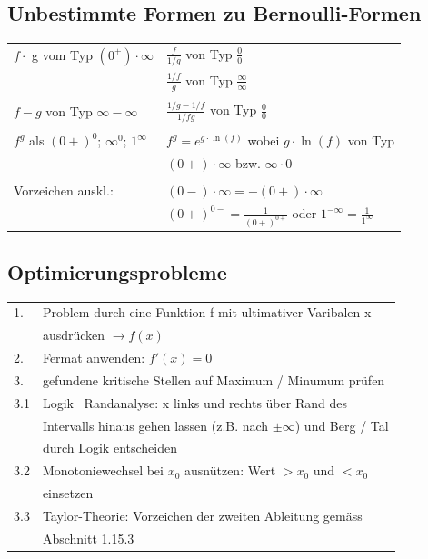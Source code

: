 		\subsection{Unbestimmte Formen zu Bernoulli-Formen}		
		\begin{tabular}{ll}
		$f \cdot$ g vom Typ $(0^+) \cdot \infty$ & $\frac{f}{1 / g}$ von Typ $\frac{0}{0}$ \\
		&   $\frac{1 / f}{g}$ von Typ $\frac{\infty}{\infty}$ \\
		\\
		$f - g$ von Typ $\infty - \infty$ & $\frac{1/g - 1/f}{1/ fg}$ von Typ $\frac{0}{0}$   \\
		\\
		$f^g$ als $(0+)^0$; $\infty^0$; $1^{\infty}$ & $f^g = e^{g \cdot \ln(f)}$ wobei $g \cdot \ln(f)$ von Typ \\
		& $(0+) \cdot \infty$ bzw. $ \infty \cdot 0$ \\
		\\
		Vorzeichen auskl.: & $(0-) \cdot \infty = -(0+) \cdot \infty$ \\
		& $(0+)^{0-} = \frac{1}{(0+)^{0+}}$ oder $1^{-\infty} = \frac{1}{1^{\infty}}$\\
		\end{tabular}
		
		
		\subsection{Optimierungsprobleme}
		\begin{tabular}{ll}
		1. & Problem durch eine Funktion f mit ultimativer Varibalen x \\
		& ausdrücken $\rightarrow f(x)$ \\
		2. & Fermat anwenden: $f'(x) = 0$\\
		3. & gefundene kritische Stellen auf Maximum / Minumum prüfen \\
		3.1 & Logik \ Randanalyse: x links und rechts über Rand des \\
		& Intervalls hinaus gehen lassen (z.B. nach $\pm \infty$) und Berg / Tal \\
		& durch Logik entscheiden \\
		3.2 & Monotoniewechsel bei $x_0$ ausnützen: Wert $> x_0$ und $< x_0$ \\
		& einsetzen \\
		3.3 & Taylor-Theorie: Vorzeichen der zweiten Ableitung gemäss \\
		& Abschnitt 1.15.3 \\
		\end{tabular}				



